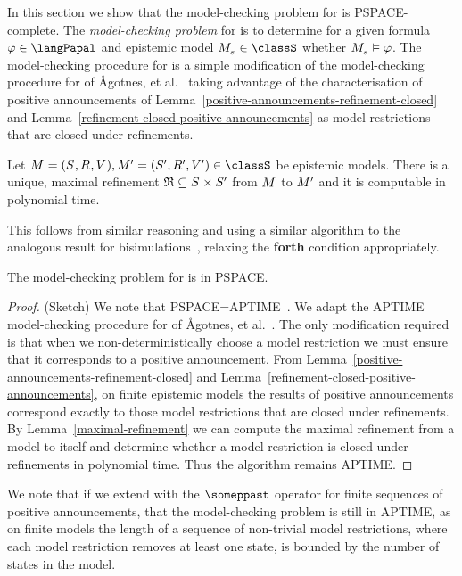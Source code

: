 In this section we show that the model-checking problem for \logicPapalS{} is PSPACE-complete.
The {\em model-checking problem} for \logicPapalS{} is to determine for a given formula $\phi \in \langPapal$ and epistemic model $\kPModel{\kStateS} \in \classS$ whether $\kPModel{\kStateS} \entails \phi$.
The model-checking procedure for \logicPapalS{} is a simple modification of the model-checking procedure for \logicApalS{} of Ågotnes, et al.~\cite{agotnes:2010} taking advantage of the characterisation of positive announcements of Lemma~\ref{positive-announcements-refinement-closed} and Lemma~\ref{refinement-closed-positive-announcements} as model restrictions that are closed under refinements.

\begin{lemma}\label{maximal-refinement}
Let $\kModelAndTuple, \kModelAndTupleP \in \classS$ be epistemic models.
There is a unique, maximal refinement $\refinement \subseteq \kStates \times \kStatesP$ from $\kModel$ to ${M^{\prime}_{}}$ and it is computable in polynomial time.
\end{lemma}

This follows from similar reasoning and using a similar algorithm to the analogous result for bisimulations~\cite{goranko:2006}, relaxing the {\bf forth} condition appropriately.

\begin{theorem}\label{papal-model-checking-pspace}
The model-checking problem for \logicPapalS{} is in PSPACE.
\end{theorem}

\begin{proof}{(Sketch)}
We note that PSPACE=APTIME~\cite{chandra:1981}.
We adapt the APTIME model-checking procedure for \logicApalS{} of Ågotnes, et al.~\cite{agotnes:2010}.
The only modification required is that when we non-deterministically choose a model restriction we must ensure that it corresponds to a positive announcement.
From Lemma~\ref{positive-announcements-refinement-closed} and Lemma~\ref{refinement-closed-positive-announcements}, on finite epistemic models the results of positive announcements correspond exactly to those model restrictions that are closed under refinements.
By Lemma~\ref{maximal-refinement} we can compute the maximal refinement from a model to itself and determine whether a model restriction is closed under refinements in polynomial time.
Thus the algorithm remains APTIME.
\end{proof}

We note that if we extend \logicPapalS{} with the $\someppast$ operator for finite sequences of positive announcements, that the model-checking problem is still in APTIME, as on finite models the length of a sequence of non-trivial model restrictions, where each model restriction removes at least one state, is bounded by the number of states in the model.

